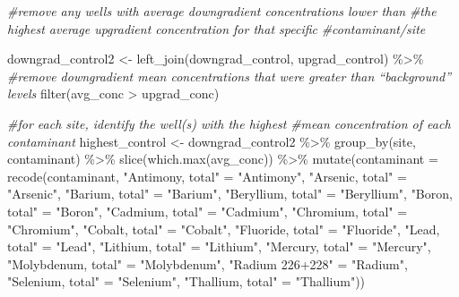 \documentclass[12pt, twoside]{amherstthesis}
\newenvironment{Shaded}{\begin{snugshade}}{\end{snugshade}}
\newcommand{\AttributeTok}[1]{\textcolor[rgb]{0.77,0.63,0.00}{#1}}
\newcommand{\CommentTok}[1]{\textcolor[rgb]{0.56,0.35,0.01}{\textit{#1}}}
\newcommand{\FunctionTok}[1]{\textcolor[rgb]{0.00,0.00,0.00}{#1}}
\newcommand{\NormalTok}[1]{#1}
\newcommand{\OtherTok}[1]{\textcolor[rgb]{0.56,0.35,0.01}{#1}}
\newcommand{\SpecialCharTok}[1]{\textcolor[rgb]{0.00,0.00,0.00}{#1}}
\newcommand{\StringTok}[1]{\textcolor[rgb]{0.31,0.60,0.02}{#1}}
\begin{document}
\begin{Shaded}
\begin{Highlighting}[]
\CommentTok{\#remove any wells with average downgradient concentrations lower than }
\CommentTok{\#the highest average upgradient concentration for that specific }
\CommentTok{\#contaminant/site}

\NormalTok{downgrad\_control2 }\OtherTok{\textless{}{-}} \FunctionTok{left\_join}\NormalTok{(downgrad\_control, upgrad\_control) }\SpecialCharTok{\%\textgreater{}\%}
  \CommentTok{\#remove downgradient mean concentrations that were greater than “background” levels}
  \FunctionTok{filter}\NormalTok{(avg\_conc }\SpecialCharTok{\textgreater{}}\NormalTok{ upgrad\_conc) }


\CommentTok{\#for each site, identify the well(s) with the highest }
\CommentTok{\#mean concentration of each contaminant}
\NormalTok{highest\_control }\OtherTok{\textless{}{-}}\NormalTok{ downgrad\_control2 }\SpecialCharTok{\%\textgreater{}\%}
  \FunctionTok{group\_by}\NormalTok{(site, contaminant) }\SpecialCharTok{\%\textgreater{}\%}
  \FunctionTok{slice}\NormalTok{(}\FunctionTok{which.max}\NormalTok{(avg\_conc)) }\SpecialCharTok{\%\textgreater{}\%}
  \FunctionTok{mutate}\NormalTok{(}\AttributeTok{contaminant =} \FunctionTok{recode}\NormalTok{(contaminant,}
                              \StringTok{"Antimony, total"} \OtherTok{=} \StringTok{"Antimony"}\NormalTok{,}
                              \StringTok{"Arsenic, total"} \OtherTok{=} \StringTok{"Arsenic"}\NormalTok{,}
                              \StringTok{"Barium, total"} \OtherTok{=} \StringTok{"Barium"}\NormalTok{,}
                              \StringTok{"Beryllium, total"} \OtherTok{=} \StringTok{"Beryllium"}\NormalTok{,}
                              \StringTok{"Boron, total"} \OtherTok{=} \StringTok{"Boron"}\NormalTok{,}
                              \StringTok{"Cadmium, total"} \OtherTok{=} \StringTok{"Cadmium"}\NormalTok{,}
                              \StringTok{"Chromium, total"} \OtherTok{=} \StringTok{"Chromium"}\NormalTok{,}
                              \StringTok{"Cobalt, total"} \OtherTok{=} \StringTok{"Cobalt"}\NormalTok{,}
                              \StringTok{"Fluoride, total"} \OtherTok{=} \StringTok{"Fluoride"}\NormalTok{,}
                              \StringTok{"Lead, total"} \OtherTok{=} \StringTok{"Lead"}\NormalTok{,}
                              \StringTok{"Lithium, total"} \OtherTok{=} \StringTok{"Lithium"}\NormalTok{,}
                              \StringTok{"Mercury, total"} \OtherTok{=} \StringTok{"Mercury"}\NormalTok{,}
                              \StringTok{"Molybdenum, total"} \OtherTok{=} \StringTok{"Molybdenum"}\NormalTok{,}
                              \StringTok{"Radium 226+228"} \OtherTok{=} \StringTok{"Radium"}\NormalTok{,}
                              \StringTok{"Selenium, total"} \OtherTok{=} \StringTok{"Selenium"}\NormalTok{,}
                              \StringTok{"Thallium, total"} \OtherTok{=} \StringTok{"Thallium"}\NormalTok{))}


\end{Highlighting}
\end{Shaded}
\end{document}
